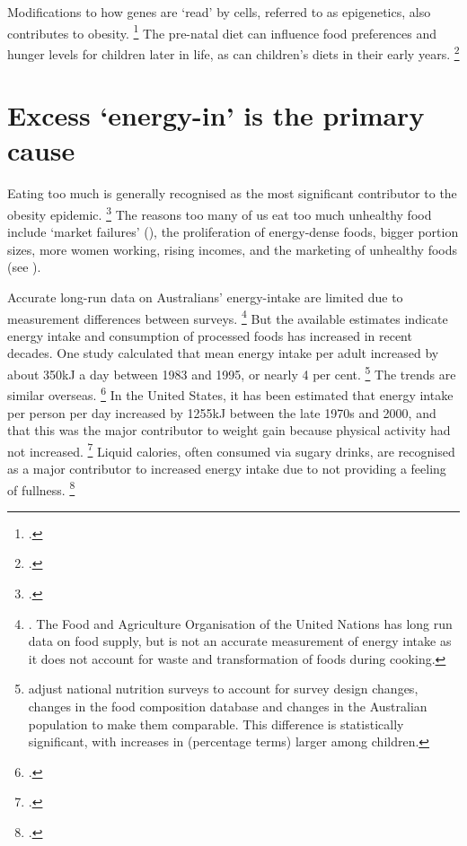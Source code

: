 \documentclass[embargoed]{grattan}
\begin{document}
Modifications to how genes are `read' by cells, referred to as epigenetics, also contributes to obesity.%
\footcite{Australia2014NoTimeWeight} The pre-natal diet can influence food preferences and hunger levels for children later in life, as can children's diets in their early years.%
\footcites{Li2010Epigeneticprogrammingmaternal}{Ebbeling2002Childhoodobesitypublic}

\section{Excess `energy-in' is the primary cause}\label{excess-energy-in-is-the-primary-cause}

Eating too much is generally recognised as the most significant contributor to the obesity epidemic.%
\footcites{Wikland2016}{Finkelstein2010EconomicsObesity}{Organisation2000Obesitypreventingmanaging}{Bray2004Consumptionhighfructose}{Ewart-Pierce2016WholeCommunityObesity}{Karnani2016ObesityCrisisas}{Livingston2012JAMAobesitytheme}{Roberto2015Patchyprogressobesity}{Tataranni2003Bodyweightgain}{Stunkard1999Energyintakenot}{Swinburn2006Estimatingeffectsenergy}{Drewnowski2005economicsobesitydietary} The reasons too many of us eat too much unhealthy food include `market failures' (), the proliferation of energy-dense foods, bigger portion sizes, more women working, rising incomes, and the marketing of unhealthy foods (see ).

Accurate long-run data on Australians' energy-intake are limited due to measurement differences between surveys.%
\footnote{\textcites{Health2012Australiasfood}{Bleich2007Whyisdeveloped}.
The Food and Agriculture Organisation of the United Nations has long run data on food supply, but is not an accurate measurement of energy intake as it does not account for waste and transformation of foods during cooking.} But the available estimates indicate energy intake and consumption of processed foods has increased in recent decades.
One study calculated that mean energy intake per adult increased by about 350kJ a day between 1983 and 1995, or nearly 4 per cent.%
\footnote{\textcite{Cook2001Comparabledatafood} adjust national nutrition surveys to account for survey design changes, changes in the food composition database and changes in the Australian population to make them comparable.
This difference is statistically significant, with increases in (percentage terms) larger among children.} The trends are similar overseas.%
\footcites{Cavadini2000USadolescentfood}{Nielsen2002Trendsenergyintake}{Bleich2007Whyisdeveloped} In the United States, it has been estimated that energy intake per person per day increased by 1255kJ between the late 1970s and 2000, and that this was the major contributor to weight gain because physical activity had not increased.%
\footcite{Woodward-Lopez2010whatextenthave} Liquid calories, often consumed via sugary drinks, are recognised as a major contributor to increased energy intake due to not providing a feeling of fullness.%
\footcites{Woodward-Lopez2010whatextenthave}{Johnson2009Dietarysugarsintake}
\end{document}
